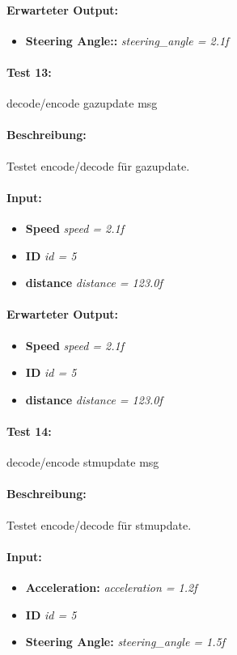 \documentclass[a4paper, 12pt, titlepage]{scrartcl}
\begin{document}
{			\paragraph{Erwarteter Output:}
			\begin{itemize} \itemsep-0.5em
				\item \textbf{Steering Angle::} \emph{steering\_angle = 2.1f}
			\end{itemize}

			\paragraph{Test 13:}{decode/encode gazupdate msg}
			\paragraph{Beschreibung:} Testet encode/decode für gazupdate.
			\paragraph{Input:}
			\begin{itemize} \itemsep-0.5em
				\item \textbf{Speed} \emph{speed = 2.1f}
				\item \textbf{ID} \emph{id = 5}
				\item \textbf{distance} \emph{distance = 123.0f}
			\end{itemize}
			\paragraph{Erwarteter Output:}
			\begin{itemize} \itemsep-0.5em
				\item \textbf{Speed} \emph{speed = 2.1f}
				\item \textbf{ID} \emph{id = 5}
				\item \textbf{distance} \emph{distance = 123.0f}
			\end{itemize}

			\paragraph{Test 14:}{decode/encode stmupdate msg}
			\paragraph{Beschreibung:} Testet encode/decode für stmupdate.
			\paragraph{Input:}
			\begin{itemize} \itemsep-0.5em
				\item \textbf{Acceleration:} \emph{acceleration = 1.2f}
				\item \textbf{ID} \emph{id = 5}
				\item \textbf{Steering Angle:} \emph{steering\_angle = 1.5f}
			\end{itemize}
}
\end{document}
